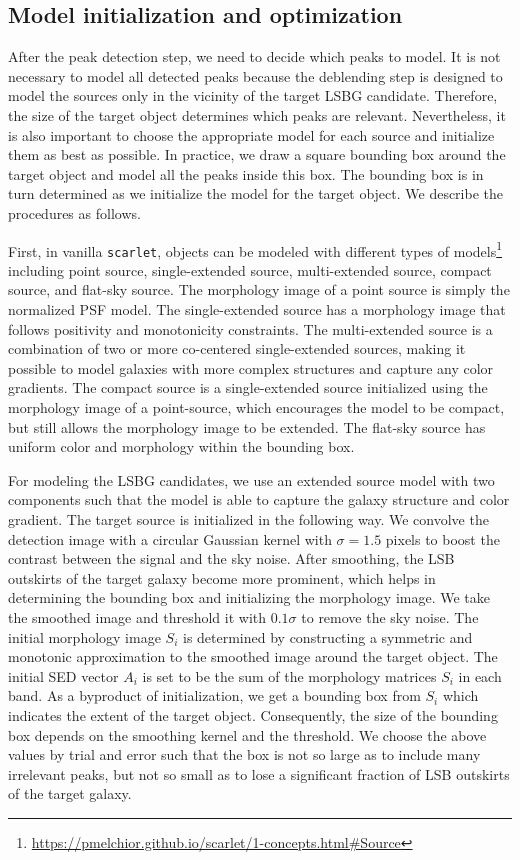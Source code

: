 \documentclass[twocolumn,astrosymb,twocolappendix]{aastex631}
\newcommand{\code}[1]{\texttt{#1}}
\begin{document}
\begin{CJK*}{UTF8}{gbsn}
\subsection{Model initialization and optimization}
After the peak detection step, we need to decide which peaks to model. It is not necessary to model all detected peaks because the deblending step is designed to model the sources only in the vicinity of the target LSBG candidate. Therefore, the size of the target object determines which peaks are relevant. Nevertheless, it is also important to choose the appropriate model for each source and initialize them as best as possible. In practice, we draw a square bounding box around the target object and model all the peaks inside this box. The bounding box is in turn determined as we initialize the model for the target object. We describe the procedures as follows. 

First, in vanilla \code{scarlet}, objects can be modeled with different types of models\footnote{\url{https://pmelchior.github.io/scarlet/1-concepts.html\#Source}} including point source, single-extended source, multi-extended source, compact source, and flat-sky source. The morphology image of a point source is simply the normalized PSF model. The single-extended source has a morphology image that follows positivity and monotonicity constraints. The multi-extended source is a combination of two or more co-centered single-extended sources, making it possible to model galaxies with more complex structures and capture any color gradients. The compact source is a single-extended source initialized using the morphology image of a point-source, which encourages the model to be compact, but still allows the morphology image to be extended. The flat-sky source has uniform color and morphology within the bounding box.

For modeling the LSBG candidates, we use an extended source model with two components such that the model is able to capture the galaxy structure and color gradient. The target source is initialized in the following way. We convolve the detection image with a circular Gaussian kernel with $\sigma=1.5$ pixels to boost the contrast between the signal and the sky noise. After smoothing, the LSB outskirts of the target galaxy become more prominent, which helps in determining the bounding box and initializing the morphology image. We take the smoothed image and threshold it with $0.1\sigma$ to remove the sky noise. The initial morphology image $S_i$ is determined by constructing a symmetric and monotonic approximation to the smoothed image around the target object. The initial SED vector $A_i$ is set to be the sum of the morphology matrices $S_i$ in each band. As a byproduct of initialization, we get a bounding box from $S_i$ which indicates the extent of the target object. Consequently, the size of the bounding box depends on the smoothing kernel and the threshold. We choose the above values by trial and error such that the box is not so large as to include many irrelevant peaks, but not so small as to lose a significant fraction of LSB outskirts of the target galaxy. 


\end{CJK*}
\end{document}
